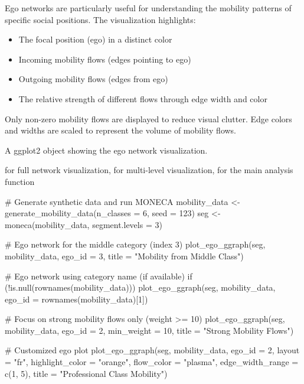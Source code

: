 \documentclass[a4paper]{book}
\begin{document}
%
\begin{Details}
Ego networks are particularly useful for understanding the mobility patterns
of specific social positions. The visualization highlights:
\begin{itemize}

\item{} The focal position (ego) in a distinct color
\item{} Incoming mobility flows (edges pointing to ego)
\item{} Outgoing mobility flows (edges from ego)
\item{} The relative strength of different flows through edge width and color

\end{itemize}


Only non-zero mobility flows are displayed to reduce visual clutter.
Edge colors and widths are scaled to represent the volume of mobility flows.
\end{Details}
%
\begin{Value}
A ggplot2 object showing the ego network visualization.
\end{Value}
%
\begin{SeeAlso}
 for full network visualization,
 for multi-level visualization,
 for the main analysis function
\end{SeeAlso}
%
\begin{Examples}
\begin{ExampleCode}
# Generate synthetic data and run MONECA
mobility_data <- generate_mobility_data(n_classes = 6, seed = 123)
seg <- moneca(mobility_data, segment.levels = 3)

# Ego network for the middle category (index 3)
plot_ego_ggraph(seg, mobility_data, ego_id = 3, 
                title = "Mobility from Middle Class")

# Ego network using category name (if available)
if (!is.null(rownames(mobility_data))) {
  plot_ego_ggraph(seg, mobility_data, ego_id = rownames(mobility_data)[1])
}

# Focus on strong mobility flows only (weight >= 10)
plot_ego_ggraph(seg, mobility_data, 
                ego_id = 2,
                min_weight = 10,
                title = "Strong Mobility Flows")

# Customized ego plot
plot_ego_ggraph(seg, mobility_data, 
                ego_id = 2,
                layout = "fr",
                highlight_color = "orange",
                flow_color = "plasma",
                edge_width_range = c(1, 5),
                title = "Professional Class Mobility")

\end{ExampleCode}
\end{Examples}
\end{document}

